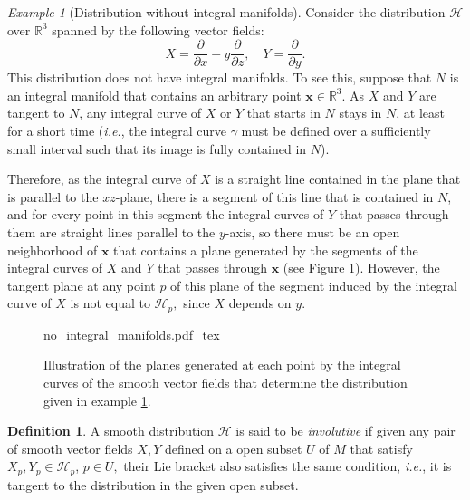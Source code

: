 \documentclass[12pt, letterpaper, reqno]{amsart}
\newcommand{\incfig}[2][1]{%
    \def\svgwidth{#1\columnwidth}
    {#2.pdf_tex}
}
\theoremstyle{definition}
\newtheorem{df}{Definition}
\theoremstyle{plain}
\theoremstyle{remark}
\newtheorem{ex}{Example}
\begin{document}
\begin{ex}[Distribution without integral manifolds] \label{ex:no_integral_manifolds}
	Consider the distribution $ \mathcal{H} $ over $ \mathbb{R}^3 $ spanned by the following vector fields: 
	$$ X = \frac{\partial}{\partial x} + y \frac{\partial}{\partial z}, \quad Y = \frac{\partial}{\partial y}.  $$ 
	This distribution does not have integral manifolds. To see this, suppose that $ N $ is an integral manifold that contains an arbitrary point $ \textbf{x} \in \mathbb{R}^3.  $ As $ X $ and $ Y $ are tangent to $ N $, any integral curve of $ X $ or $ Y $ that starts in $ N $ stays in $ N $, at least for a short time (\textit{i.e.}, the integral curve $ \gamma $ must be defined over a sufficiently small interval such that its image is fully contained in $ N $).   

	Therefore, as the integral curve of $ X $ is a straight line contained in the plane that is parallel to the $ xz $-plane, there is a segment of this line that is contained in $ N $, and for every point in this segment the integral curves of $ Y $ that passes through them are straight lines parallel to the $ y $-axis, so there must be an open neighborhood of $ \textbf{x}  $ that contains a plane generated by the segments of the integral curves of $ X $ and $ Y $ that passes through $ \textbf{x}$ (see Figure \ref{fig:no_integral_manifolds}). However, the tangent plane at any point $ p $  of this plane  of the segment induced by the integral curve of $ X $ is not equal to $ \mathcal{H}_p, $ since $ X $ depends on $ y $.   
\end{ex}

\begin{figure}
    \centering
    \incfig{no_integral_manifolds}
    \caption{Illustration of the planes generated at each point by the integral curves of the smooth vector fields that determine the distribution given in example \ref{ex:no_integral_manifolds}.}
    \label{fig:no_integral_manifolds}
\end{figure}

\begin{df}
	
A smooth distribution $ \mathcal{H} $ is said to be \textit{involutive} if given any pair of smooth vector fields $ X,Y $ defined on a open subset $ U $  of $ M $  that satisfy $X_p,Y_p\in \mathcal{H}_p $, $ p\in U, $ their Lie bracket also satisfies the same condition, \textit{i.e.}, it is tangent to the distribution in the given open subset. 
\end{df}
\end{document}
